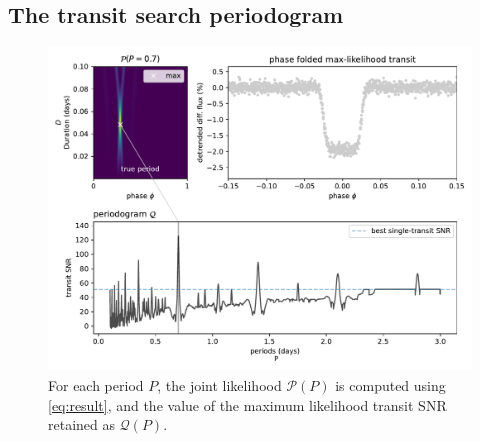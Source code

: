 \documentclass{aastex631}
\begin{document}
\subsection{The transit search periodogram}

\begin{figure}[H]
    \begin{centering}
        \includegraphics[width=0.8\linewidth]{principle_Q.pdf}
        \caption{For each period $P$, the joint likelihood $\mathcal{P}(P)$ is computed using \autoref{eq:result}, and the value of the maximum likelihood transit SNR retained as $\mathcal{Q}(P)$.}
        \label{fig:periodogram}
    \end{centering}
\end{figure}
\end{document}
